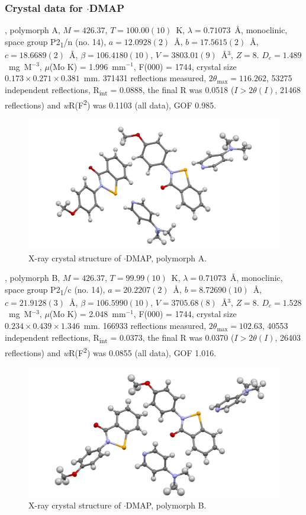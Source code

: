 \begin{refsection}
\subsubsection{Crystal data for \texorpdfstring{$\cdot$DMAP}{C21 H21 N3 O2 Se}}
, polymorph A, $M=426.37$, $T=100.00(10)$~K, $\lambda=0.71073$~\AA, monoclinic, space group P2\textsubscript{1}/n (no. 14), $a = 12.0928(2)$~\AA, $b = 17.5615(2)$~\AA, $c = 18.6689(2)$~\AA, $\beta = 106.4180(10)$\degree, $V = 3803.01(9)$~\AA$^{3}$, $Z = 8$. $D_{c}= 1.489$~mg~M$^{-3}$, $\mu$(Mo K\a) = 1.996~mm$^{-1}$, F(000) = 1744, crystal size $0.173 \times 0.271 \times 0.381$~mm. 371431 reflections measured, $2\theta_{\mathrm{max}}=116.262$\degree, 53275 independent reflections, R\textsubscript{int} = 0.0888, the final R was 0.0518 ($I > 2\theta(I)$, 21468 reflections) and \emph{w}R(F\textsuperscript{2}) was 0.1103 (all data), GOF 0.985.

\begin{figure}
  \includegraphics[width=0.6\linewidth]{Figures/ebs-4ome-dmap-a-xtal.pdf}
  \caption{X-ray crystal structure of \texorpdfstring{$\cdot$DMAP}{C21 H21 N3 O2 Se}, polymorph A.}
\end{figure}

, polymorph B, $M=426.37$, $T=99.99(10)$~K, $\lambda=0.71073$~\AA, monoclinic, space group P2\textsubscript{1}/c (no. 14), $a = 20.2207(2)$~\AA, $b = 8.72690(10)$~\AA, $c = 21.9128(3)$~\AA, $\beta = 106.5990(10)$\degree, $V = 3705.68(8)$~\AA$^{3}$, $Z = 8$. $D_{c}= 1.528$~mg~M$^{-3}$, $\mu$(Mo K\a) = 2.048~mm$^{-1}$, F(000) = 1744, crystal size $0.234 \times 0.439 \times 1.346$~mm. 166933 reflections measured, $2\theta_{\mathrm{max}}=102.63$\degree, 40553 independent reflections, R\textsubscript{int} = 0.0373, the final R was 0.0370 ($I > 2\theta(I)$, 26403 reflections) and \emph{w}R(F\textsuperscript{2}) was 0.0855 (all data), GOF 1.016.

\begin{figure}
  \includegraphics[width=0.6\linewidth]{Figures/ebs-4ome-dmap-b-xtal.pdf}
  \caption{X-ray crystal structure of \texorpdfstring{$\cdot$DMAP}{C21 H21 N3 O2 Se}, polymorph B.}
\end{figure}


\end{refsection}

